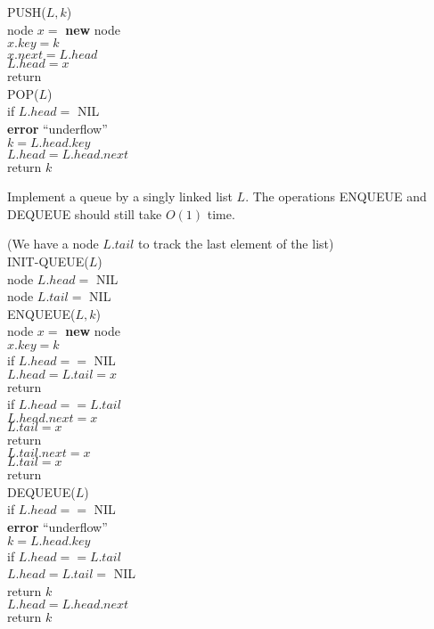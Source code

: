\documentclass[12pt, a4paper, UTF8]{ctexart}
\begin{document}
\begin{solution}
  PUSH($L,k$)\\
  \indent node $x =$ \textbf{new} node\\
  \indent $x.key = k$\\
  \indent $x.next = L.head$\\
  \indent $L.head = x$\\
  \indent return\\
  POP($L$)\\
  \indent if $L.head =$ NIL\\
  \indent\indent \textbf{error} ``underflow''\\
  \indent $k = L.head.key$\\
  \indent $L.head = L.head.next$\\
  \indent return $k$
\end{solution}

\begin{problem}[TC: 10.2-3]
  Implement a queue by a singly linked list $L$. The operations ENQUEUE and 
  DEQUEUE should still take $O(1)$ time.
\end{problem}

\begin{solution}
  (We have a node $L.tail$ to track the last element of the list)\\
  INIT-QUEUE($L$)\\
  \indent node $L.head =$ NIL\\
  \indent node $L.tail =$ NIL\\
  ENQUEUE($L,k$)\\
  \indent node $x =$ \textbf{new} node\\
  \indent $x.key = k$\\
  \indent if $L.head ==$ NIL\\
  \indent\indent $L.head = L.tail = x$\\
  \indent\indent return\\
  \indent if $L.head == L.tail$\\
  \indent\indent $L.head.next = x$\\
  \indent\indent $L.tail = x$\\
  \indent\indent return\\
  \indent $L.tail.next = x$\\
  \indent $L.tail = x$\\
  \indent return\\
  DEQUEUE($L$)\\
  \indent if $L.head ==$ NIL\\
  \indent\indent \textbf{error} ``underflow''\\
  \indent $k = L.head.key$\\
  \indent if $L.head == L.tail$\\
  \indent\indent $L.head = L.tail =$ NIL\\
  \indent\indent return $k$\\
  \indent $L.head = L.head.next$\\
  \indent return $k$
\end{solution}
\end{document}

